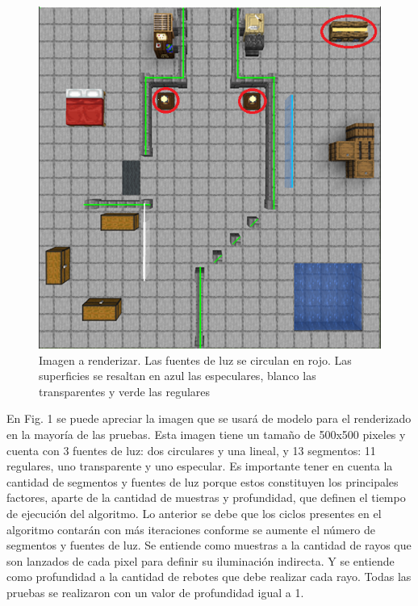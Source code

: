 \documentclass[conference]{IEEEtran}
\begin{document}
\begin{figure}[htbp]
\centerline{\includegraphics[scale=0.68]{Imagenes/Reference Image.png}}
\caption{Imagen a renderizar. Las fuentes de luz se circulan en rojo. Las superficies se resaltan en azul las especulares, blanco las transparentes y verde las regulares}
\label{Imagen de referencia}
\end{figure}

En Fig. 1 se puede apreciar la imagen que se usará de modelo para el renderizado en la mayoría de las pruebas. Esta imagen tiene un tamaño de 500x500 pixeles y cuenta con 3 fuentes de luz: dos circulares y una lineal, y 13 segmentos: 11 regulares, uno transparente y uno especular. Es importante tener en cuenta la cantidad de segmentos y fuentes de luz porque estos constituyen los principales factores, aparte de la cantidad de muestras y profundidad, que definen el tiempo de ejecución del algoritmo. Lo anterior se debe que los ciclos presentes en el algoritmo contarán con más iteraciones conforme se aumente el número de segmentos y fuentes de luz. Se entiende como muestras a la cantidad de rayos que son lanzados de cada pixel para definir su iluminación indirecta. Y se entiende como profundidad a la cantidad de rebotes que debe realizar cada rayo. Todas las pruebas se realizaron con un valor de profundidad igual a 1.
\end{document}
